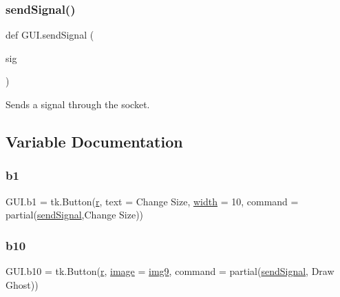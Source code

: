 \mbox{\label{namespace_g_u_i_ae82f740e6453cdd542b52ede1560c2c3}} 
\subsubsection{\texorpdfstring{sendSignal()}{sendSignal()}}
{\footnotesize\ttfamily def G\+U\+I.\+send\+Signal (\begin{DoxyParamCaption}\item[{}]{sig }\end{DoxyParamCaption})}



Sends a signal through the socket. 



\subsection{Variable Documentation}
\mbox{\label{namespace_g_u_i_a329472468460bb661747b9e01449d184}} 
\subsubsection{\texorpdfstring{b1}{b1}}
{\footnotesize\ttfamily G\+U\+I.\+b1 = tk.\+Button(\mbox{\hyperlink{_s_d_l__opengl_8h_a42ce7cdc612e53abee15043f80220d97}{r}}, text = \textquotesingle{}Change Size\textquotesingle{}, \mbox{\hyperlink{_s_d_l__opengl_8h_a9a82cf3caff84cabc4598e2619faac17}{width}} = 10, command = partial(\mbox{\hyperlink{namespace_g_u_i_ae82f740e6453cdd542b52ede1560c2c3}{send\+Signal}},\textquotesingle{}Change Size\textquotesingle{}))}

\mbox{\label{namespace_g_u_i_a385149b9ed164ef153e01cc07a42a12f}} 
\subsubsection{\texorpdfstring{b10}{b10}}
{\footnotesize\ttfamily G\+U\+I.\+b10 = tk.\+Button(\mbox{\hyperlink{_s_d_l__opengl_8h_a42ce7cdc612e53abee15043f80220d97}{r}}, \mbox{\hyperlink{_s_d_l__opengl_8h_a0a221b005894579fea3b9eb7bfc2ee71}{image}} = \mbox{\hyperlink{namespace_g_u_i_a6ece4b78fbb7ed63258caf1a781471f4}{img9}}, command = partial(\mbox{\hyperlink{namespace_g_u_i_ae82f740e6453cdd542b52ede1560c2c3}{send\+Signal}}, \textquotesingle{}Draw Ghost\textquotesingle{}))}

